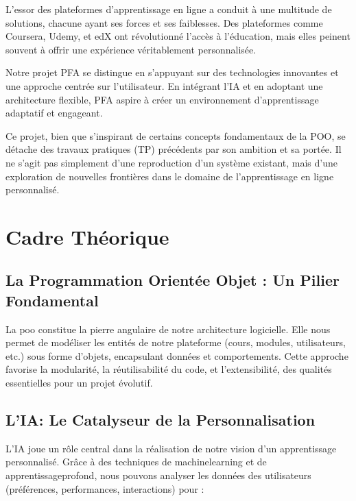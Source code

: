\dotfill

\begin{displayquote}
L'essor des plateformes d'apprentissage en ligne a conduit à une multitude de solutions, chacune ayant ses forces et ses faiblesses. Des plateformes comme Coursera, Udemy, et edX ont révolutionné l'accès à l'éducation, mais elles peinent souvent à offrir une expérience véritablement personnalisée.

Notre projet PFA se distingue en s'appuyant sur des technologies innovantes et une approche centrée sur l'utilisateur. En intégrant l'IA et en adoptant une architecture flexible, PFA aspire à créer un environnement d'apprentissage adaptatif et engageant.

Ce projet, bien que s'inspirant de certains concepts fondamentaux de la POO, se détache des travaux pratiques (TP) précédents par son ambition et sa portée. Il ne s'agit pas simplement d'une reproduction d'un système existant, mais d'une exploration de nouvelles frontières dans le domaine de l'apprentissage en ligne personnalisé.
\end{displayquote}

\section{Cadre Théorique}

\subsection{La Programmation Orientée Objet : Un Pilier Fondamental}

La \gls{poo} constitue la pierre angulaire de notre architecture logicielle. Elle nous permet de modéliser les entités de notre plateforme (cours, modules, utilisateurs, etc.) sous forme d'objets, encapsulant données et comportements. Cette approche favorise la modularité, la réutilisabilité du code, et l'extensibilité, des qualités essentielles pour un projet évolutif.

\subsection{L'IA: Le Catalyseur de la Personnalisation}

L'\gls{IA} joue un rôle central dans la réalisation de notre vision d'un apprentissage personnalisé. Grâce à des techniques de \gls{machinelearning} et de \gls{apprentissageprofond}, nous pouvons analyser les données des utilisateurs (préférences, performances, interactions) pour :

